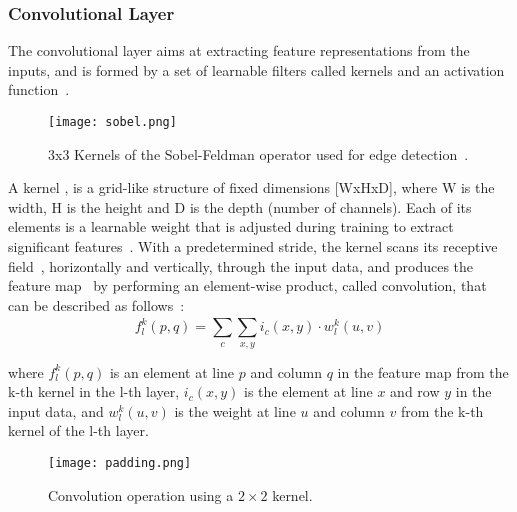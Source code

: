 \documentclass[class=report, crop=false, a4paper, 12pt]{standalone}
\begin{document}
\subsubsection{Convolutional Layer}
\par The convolutional layer aims at extracting feature representations from the inputs, and is formed by a set of learnable filters called kernels and an activation function~\autocite{guRecentAdvancesConvolutional2018,yamashitaConvolutionalNeuralNetworks2018}. 

\begin{figure}[!h]
    \centering
    \texttt{[image: sobel.png]}
    \caption{3x3 Kernels of the Sobel-Feldman operator used for edge detection~\autocite{sobelIsotropicGradientOperator1973}.}
    \label{fig:sobel}
\end{figure}

A kernel , is a grid-like structure of fixed dimensions [WxHxD], where W is the width, H is the height and D is the depth (number of channels). Each of its elements is a learnable weight that is adjusted during training to extract significant features~\autocite{alzubaidiReviewDeepLearning2021}. With a predetermined stride, the kernel scans its receptive field~\autocite{khanSurveyRecentArchitectures2020}, horizontally and vertically, through the input data, and produces the feature map~\autocite{lecunDeepLearning2015, alzubaidiReviewDeepLearning2021} by performing an element-wise product, called convolution, that can be described as follows~\autocite{khanSurveyRecentArchitectures2020}:
\begin{equation}
    f_l^k(p, q) = \sum_{c}^{}\sum_{x, y}^{}i_c(x, y)\cdot w^k_l(u,v)
\end{equation}

where $f_l^k(p, q)$ is an element at line $p$ and column $q$ in the feature map from the k-th kernel in the l-th layer, $i_c(x, y)$ is the element at line $x$ and row $y$ in the input data, and $w^k_l(u,v)$ is the weight at line $u$ and column $v$ from the k-th kernel of the l-th layer.

\begin{figure}[H]
    \centering
    \texttt{[image: padding.png]} %
    \caption{Convolution operation using a $2\times2$ kernel.}
    \label{fig:padding}
\end{figure}
\end{document}
